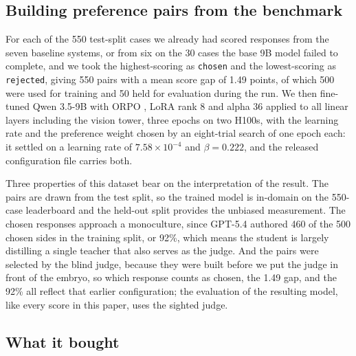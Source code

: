 \subsection{Building preference pairs from the benchmark}

For each of the 550 test-split cases we already had scored responses from the
seven baseline systems, or from six on the 30 cases the base 9B model failed to
complete, and we took the highest-scoring as \texttt{chosen} and the
lowest-scoring as \texttt{rejected}, giving 550 pairs with a mean score gap of 1.49 points, of
which 500 were used for training and 50 held for evaluation during the run. We then fine-tuned Qwen 3.5-9B with ORPO
\citep{hong2024orpo}, LoRA rank 8 and alpha 36 applied to all linear layers
including the vision tower, three epochs on two H100s, with the learning rate and
the preference weight chosen by an eight-trial search of one epoch each: it
settled on a learning rate of $7.58\times10^{-4}$ and $\beta = 0.222$, and the
released configuration file carries both.

Three properties of this dataset bear on the interpretation of the result. The
pairs are drawn from the test split, so the trained model is in-domain on the
550-case leaderboard and the held-out split provides the unbiased measurement. The
chosen responses approach a monoculture, since GPT-5.4 authored 460 of the 500
chosen sides in the training split, or 92\%, which means the student is largely
distilling a single teacher that also serves as the judge. And the pairs were
selected by the blind judge, because they were built before we put the judge in
front of the embryo, so which response counts as chosen, the 1.49 gap, and the
92\% all reflect that earlier configuration; the evaluation of the resulting
model, like every score in this paper, uses the sighted judge.

\subsection{What it bought}


